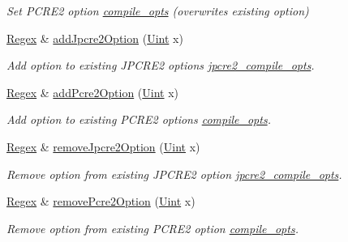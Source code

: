 \begin{DoxyCompactItemize}
\begin{DoxyCompactList}\small\item\em Set P\+C\+R\+E2 option \hyperlink{classjpcre2_1_1Regex_a5954131e9085de63229ed5c11417df69}{compile\+\_\+opts} (overwrites existing option) \end{DoxyCompactList}\item 
\hyperlink{classjpcre2_1_1Regex}{Regex} \& \hyperlink{classjpcre2_1_1Regex_a03974fa7ba8f7c47186cb8d6f54934de}{add\+Jpcre2\+Option} (\hyperlink{namespacejpcre2_a078242d38221a13fb3543b9edd78c099}{Uint} x)
\begin{DoxyCompactList}\small\item\em Add option to existing J\+P\+C\+R\+E2 options \hyperlink{classjpcre2_1_1Regex_abdd26c3bc1c3132f0aa73dde1690a7ef}{jpcre2\+\_\+compile\+\_\+opts}. \end{DoxyCompactList}\item 
\hyperlink{classjpcre2_1_1Regex}{Regex} \& \hyperlink{classjpcre2_1_1Regex_a2c7dcf12f26b2b046e147b013c8b5087}{add\+Pcre2\+Option} (\hyperlink{namespacejpcre2_a078242d38221a13fb3543b9edd78c099}{Uint} x)
\begin{DoxyCompactList}\small\item\em Add option to existing P\+C\+R\+E2 options \hyperlink{classjpcre2_1_1Regex_a5954131e9085de63229ed5c11417df69}{compile\+\_\+opts}. \end{DoxyCompactList}\item 
\hyperlink{classjpcre2_1_1Regex}{Regex} \& \hyperlink{classjpcre2_1_1Regex_a91ffbc407562d4526fd21bc7b63a0a49}{remove\+Jpcre2\+Option} (\hyperlink{namespacejpcre2_a078242d38221a13fb3543b9edd78c099}{Uint} x)
\begin{DoxyCompactList}\small\item\em Remove option from existing J\+P\+C\+R\+E2 option \hyperlink{classjpcre2_1_1Regex_abdd26c3bc1c3132f0aa73dde1690a7ef}{jpcre2\+\_\+compile\+\_\+opts}. \end{DoxyCompactList}\item 
\hyperlink{classjpcre2_1_1Regex}{Regex} \& \hyperlink{classjpcre2_1_1Regex_a09b14cf78ae3a3302533783b7fab40a8}{remove\+Pcre2\+Option} (\hyperlink{namespacejpcre2_a078242d38221a13fb3543b9edd78c099}{Uint} x)
\begin{DoxyCompactList}\small\item\em Remove option from existing P\+C\+R\+E2 option \hyperlink{classjpcre2_1_1Regex_a5954131e9085de63229ed5c11417df69}{compile\+\_\+opts}. \end{DoxyCompactList}\item 

\end{DoxyCompactItemize}
